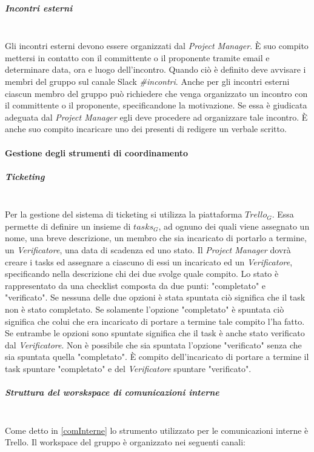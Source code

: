 			\subparagraph{Incontri esterni} \mbox{} \\
			 Gli incontri esterni devono essere organizzati dal \emph{Project Manager}. È suo compito mettersi in contatto con il committente o il proponente tramite email e determinare data, ora e luogo dell'incontro. Quando ciò è definito deve avvisare i membri del gruppo sul canale Slack \emph{\#incontri}. Anche per gli incontri esterni ciascun membro del gruppo può richiedere che venga organizzato un incontro con il committente o il proponente, specificandone la motivazione. Se essa è giudicata adeguata dal \emph{Project Manager} egli deve procedere ad organizzare tale incontro. È anche suo compito incaricare uno dei presenti di redigere un verbale scritto.
		\paragraph{Gestione degli strumenti di coordinamento}
			\subparagraph{Ticketing} \mbox{} \\
			Per la gestione del sistema di ticketing si utilizza la piattaforma $Trello_G$. Essa permette di definire un insieme di $tasks_G$, ad ognuno dei quali viene assegnato un nome, una breve descrizione, un membro che sia incaricato di portarlo a termine, un \emph{Verificatore}, una data di scadenza ed uno stato. Il \emph{Project Manager} dovrà creare i tasks ed assegnare a ciascuno di essi un incaricato ed un \emph{Verificatore}, specificando nella descrizione chi dei due svolge quale compito. Lo stato è rappresentato da una checklist composta da due punti: "completato" e "verificato". Se nessuna delle due opzioni è stata spuntata ciò significa che il task non è stato completato. Se solamente l'opzione "completato" è spuntata ciò significa che colui che era incaricato di portare a termine tale compito l'ha fatto. Se entrambe le opzioni sono spuntate significa che il task è anche stato verificato dal \emph{Verificatore}. Non è possibile che sia spuntata l'opzione "verificato" senza che sia spuntata quella "completato". È compito dell'incaricato di portare a termine il task spuntare "completato" e del \emph{Verificatore} spuntare "verificato".
			\subparagraph{Struttura del worskspace di comunicazioni interne} \mbox{} \\
			Come detto in \ref{comInterne} lo strumento utilizzato per le comunicazioni interne è Trello. Il workspace del gruppo è organizzato nei seguenti canali:
